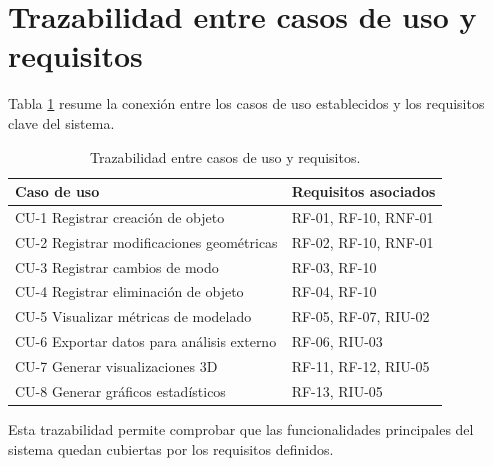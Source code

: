 \section{Trazabilidad entre casos de uso y requisitos}

Tabla \ref{tab:trazabilidad_requisitos} resume la conexión entre los casos de uso establecidos y los requisitos clave del sistema.

\begin{table}[H]
\centering
\small
\begin{tabular}{l l}
\hline
\textbf{Caso de uso} & \textbf{Requisitos asociados} \\
\hline
CU-1 Registrar creación de objeto & RF-01, RF-10, RNF-01 \\
CU-2 Registrar modificaciones geométricas & RF-02, RF-10, RNF-01 \\
CU-3 Registrar cambios de modo & RF-03, RF-10 \\
CU-4 Registrar eliminación de objeto & RF-04, RF-10 \\
CU-5 Visualizar métricas de modelado & RF-05, RF-07, RIU-02 \\
CU-6 Exportar datos para análisis externo & RF-06, RIU-03 \\
CU-7 Generar visualizaciones 3D & RF-11, RF-12, RIU-05 \\
CU-8 Generar gráficos estadísticos & RF-13, RIU-05 \\
\hline
\end{tabular}
\caption{Trazabilidad entre casos de uso y requisitos.}
\label{tab:trazabilidad_requisitos}
\end{table}

Esta trazabilidad permite comprobar que las funcionalidades principales del sistema quedan cubiertas por los requisitos definidos.
